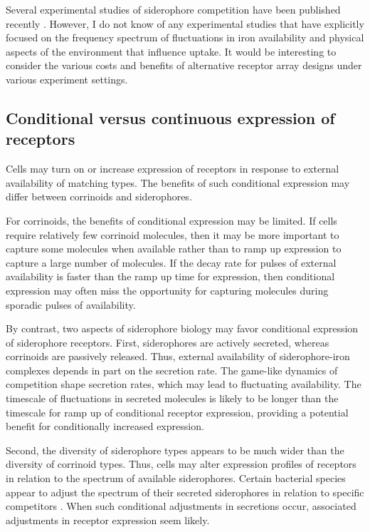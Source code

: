 \documentclass[\mydocfontsize]{article}
\begin{document}
\begin{multicols}{2}
Several experimental studies of siderophore competition have been published recently \autocite{west07the-social,hibbing10bacterial}. However, I do not know of any experimental studies that have explicitly focused on the frequency spectrum of fluctuations in iron availability and physical aspects of the environment that influence uptake. It would be interesting to consider the various costs and benefits of alternative receptor array designs under various experiment settings.

\subsection{Conditional versus continuous expression of receptors}

Cells may turn on or increase expression of receptors in response to external availability of matching types. The benefits of such conditional expression may differ between corrinoids and siderophores.

For corrinoids, the benefits of conditional expression may be limited. If cells require relatively few corrinoid molecules, then it may be more important to capture some molecules when available rather than to ramp up expression to capture a large number of molecules. If the decay rate for pulses of external availability is faster than the ramp up time for expression, then conditional expression may often miss the opportunity for capturing molecules during sporadic pulses of availability. 

By contrast, two aspects of siderophore biology may favor conditional expression of siderophore receptors. First, siderophores are actively secreted, whereas corrinoids are passively released. Thus, external availability of siderophore-iron complexes depends in part on the secretion rate. The game-like dynamics of competition shape secretion rates, which may lead to fluctuating availability. The timescale of fluctuations in secreted molecules is likely to be longer than the timescale for ramp up of conditional receptor expression, providing a potential benefit for conditionally increased expression. 

Second, the diversity of siderophore types appears to be much wider than the diversity of corrinoid types. Thus, cells may alter expression profiles of receptors in relation to the spectrum of available siderophores. Certain bacterial species appear to adjust the spectrum of their secreted siderophores in relation to specific competitors \autocite{traxler13interspecies}. When such conditional adjustments in secretions occur, associated adjustments in receptor expression seem likely.


\end{multicols}
\end{document}
